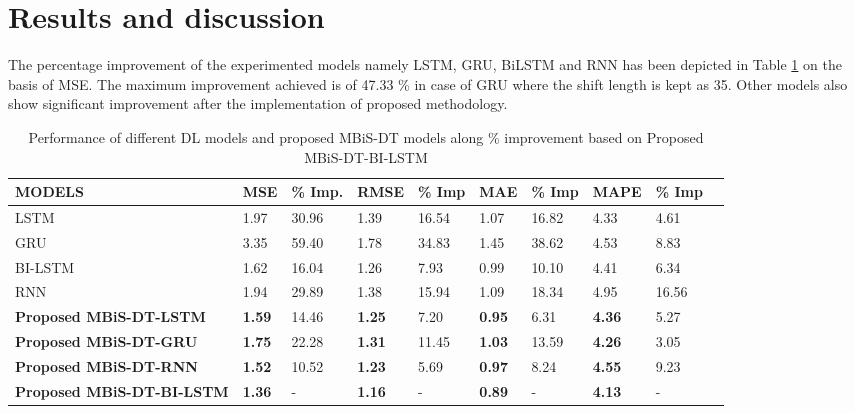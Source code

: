 \documentclass[sn-mathphys,Numbered]{sn-jnl}
\theoremstyle{thmstyleone}
\theoremstyle{thmstyletwo}
\theoremstyle{thmstylethree}
\begin{document}
\section{Results and discussion}\label{sec2}
The percentage improvement  of the experimented models namely LSTM, GRU, BiLSTM and RNN has been depicted in Table \ref{tab:MSE} on the basis of MSE. The maximum improvement achieved is of 47.33 \% in case of GRU where the shift length is kept as 35. Other models also show significant improvement after the implementation of proposed methodology.

\begin{table}[ht!]
\centering
\caption{Performance of different DL models and proposed MBiS-DT models along \% improvement based on Proposed MBiS-DT-BI-LSTM }
\label{tab:MSE}
\begin{tabular}{p{}lllllllll}
\hline
\textbf{MODELS} & \textbf{MSE} & \textbf{\% Imp.} & \textbf{RMSE} & \textbf{\% Imp} & \textbf{MAE} & \textbf{\% Imp} & \textbf{MAPE} & \textbf{\% Imp}  \\ \hline
  LSTM    & 1.97 &30.96  & 1.39  &16.54  & 1.07 &16.82  & 4.33 &4.61  \\
  GRU    & 3.35 &59.40  & 1.78 &34.83  & 1.45 & 38.62 & 4.53 &8.83  \\
  BI-LSTM & 1.62   &16.04  & 1.26 &7.93  & 0.99 &10.10  & 4.41 &6.34   \\
  RNN     & 1.94   &29.89  & 1.38 &15.94  & 1.09 &18.34  & 4.95&16.56   \\
\textbf{Proposed MBiS-DT-LSTM}    & \textbf{1.59}  &14.46      & \textbf{1.25} &7.20     & \textbf{0.95} &6.31     & \textbf{4.36} &5.27     \\
\textbf{Proposed MBiS-DT-GRU}     & \textbf{1.75} &22.28     & \textbf{1.31} &11.45     & \textbf{1.03} & 13.59    & \textbf{4.26} &3.05      \\
\textbf{Proposed MBiS-DT-RNN}     & \textbf{1.52}   &10.52     & \textbf{1.23} &5.69     & \textbf{0.97} &8.24     & \textbf{4.55} &9.23     \\
\textbf{Proposed MBiS-DT-BI-LSTM} & \textbf{1.36}   & -    & \textbf{1.16} &-     & \textbf{0.89} & -    & \textbf{4.13} & -     \\
\hline
\end{tabular}
\end{table}
\end{document}
